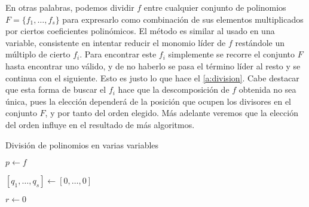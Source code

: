 En otras palabras, podemos dividir $f$ entre cualquier conjunto de polinomios $F=\{f_1, \dots, f_s\}$ para expresarlo como combinación de sus elementos multiplicados por ciertos coeficientes polinómicos. El método es similar al usado en una variable, consistente en intentar reducir el monomio líder de $f$ restándole un múltiplo de cierto $f_i$. Para encontrar este $f_i$ simplemente se recorre el conjunto $F$ hasta encontrar uno válido, y de no haberlo se pasa el término líder al resto y se continua con el siguiente. Esto es justo lo que hace el \autoref{a:division}. Cabe destacar que esta forma de buscar el $f_i$ hace que la descomposición de $f$ obtenida no sea única, pues la elección dependerá de la posición que ocupen los divisores en el conjunto $F$, y por tanto del orden elegido. Más adelante veremos que la elección del orden influye en el resultado de más algoritmos.

\begin{algorithm}[hbt!]
    \caption{División de polinomios en varias variables}\label{a:division}
    $p\gets f$
    
    $\left[q_1,\dots, q_s\right] \gets \left[0,\dots, 0\right]$
    
    $r\gets 0$

\end{algorithm}

